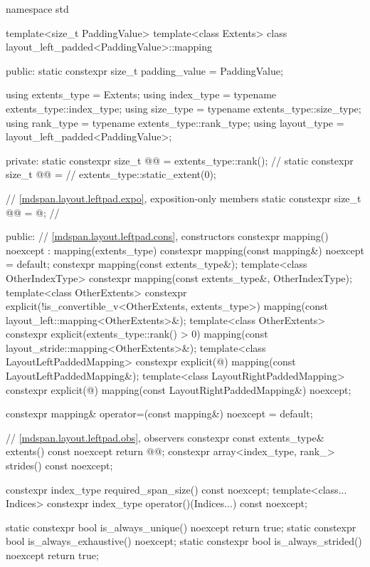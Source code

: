 \begin{codeblock}
namespace std {
  template<size_t PaddingValue>
  template<class Extents>
  class layout_left_padded<PaddingValue>::mapping {
  public:
    static constexpr size_t padding_value = PaddingValue;

    using extents_type = Extents;
    using index_type = typename extents_type::index_type;
    using size_type = typename extents_type::size_type;
    using rank_type = typename extents_type::rank_type;
    using layout_type = layout_left_padded<PaddingValue>;

  private:
    static constexpr size_t @@ = extents_type::rank();         // \expos
    static constexpr size_t @@ =                 // \expos
      extents_type::static_extent(0);

    // \ref{mdspan.layout.leftpad.expo}, exposition-only members
    static constexpr size_t @@ = @\seebelow@;  // \expos

  public:
    // \ref{mdspan.layout.leftpad.cons}, constructors
    constexpr mapping() noexcept : mapping(extents_type{}) {}
    constexpr mapping(const mapping&) noexcept = default;
    constexpr mapping(const extents_type&);
    template<class OtherIndexType>
      constexpr mapping(const extents_type&, OtherIndexType);
    template<class OtherExtents>
      constexpr explicit(!is_convertible_v<OtherExtents, extents_type>)
        mapping(const layout_left::mapping<OtherExtents>&);
    template<class OtherExtents>
      constexpr explicit(extents_type::rank() > 0)
        mapping(const layout_stride::mapping<OtherExtents>&);
    template<class LayoutLeftPaddedMapping>
      constexpr explicit(@\seebelow@)
        mapping(const LayoutLeftPaddedMapping&);
    template<class LayoutRightPaddedMapping>
      constexpr explicit(@\seebelow@)
        mapping(const LayoutRightPaddedMapping&) noexcept;

    constexpr mapping& operator=(const mapping&) noexcept = default;

    // \ref{mdspan.layout.leftpad.obs}, observers
    constexpr const extents_type& extents() const noexcept { return @@; }
    constexpr array<index_type, rank_> strides() const noexcept;

    constexpr index_type required_span_size() const noexcept;
    template<class... Indices>
      constexpr index_type operator()(Indices...) const noexcept;

    static constexpr bool is_always_unique() noexcept { return true; }
    static constexpr bool is_always_exhaustive() noexcept;
    static constexpr bool is_always_strided() noexcept { return true; }

}}
\end{codeblock}
